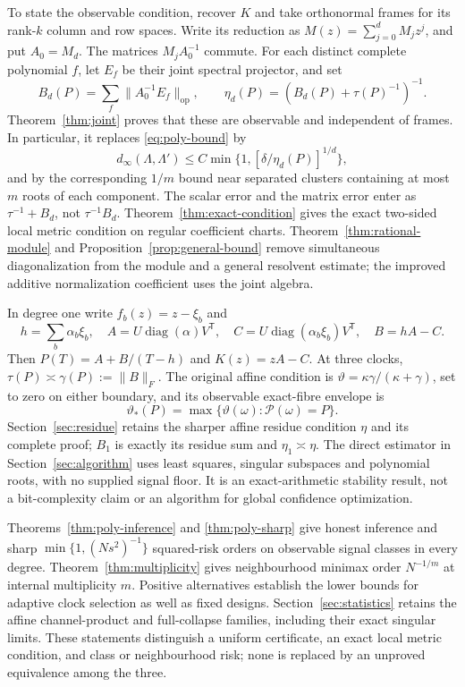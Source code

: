 \documentclass[11pt,reqno]{amsart}
\numberwithin{equation}{section}
\theoremstyle{definition}\newtheorem{definition}[theorem]{Definition}
\theoremstyle{remark}\newtheorem{remark}[theorem]{Remark}
\newcommand{\diag}{\operatorname{diag}}
\newcommand{\op}{\mathrm{op}}
\newcommand{\sig}{\vartheta}
\begin{document}
To state the observable condition, recover $K$ and take orthonormal
frames for its rank-$k$ column and row spaces. Write its reduction as
$M(z)=\sum_{j=0}^dM_jz^j$, and put $A_0=M_d$.
The matrices $M_jA_0^{-1}$ commute. For each distinct complete
polynomial $f$, let $E_f$ be their joint spectral projector, and set
\[
 B_d(P)=\sum_f\|A_0^{-1}E_f\|_\op,
 \qquad \eta_d(P)=(B_d(P)+\tau(P)^{-1})^{-1}.
\]
Theorem~\ref{thm:joint} proves that these are observable and independent
of frames. In particular, it replaces \eqref{eq:poly-bound} by
\[
 d_\infty(\Lambda,\Lambda')
       \le C\min\{1,[\delta/\eta_d(P)]^{1/d}\},
\]
and by the corresponding $1/m$ bound near separated clusters containing
at most $m$ roots of each component. The scalar error and the matrix
error enter as $\tau^{-1}+B_d$, not $\tau^{-1}B_d$.
Theorem~\ref{thm:exact-condition} gives the exact two-sided local metric
condition on regular coefficient charts. Theorem~\ref{thm:rational-module}
and Proposition~\ref{prop:general-bound} remove simultaneous
diagonalization from the module and a general resolvent estimate;
the improved additive normalization coefficient uses the joint algebra.

In degree one write $f_b(z)=z-\xi_b$ and
\begin{equation}\label{eq:affine}
 h=\sum_b\alpha_b\xi_b,\quad
 A=U\diag(\alpha)V^{\mathsf T},\quad
 C=U\diag(\alpha_b\xi_b)V^{\mathsf T},\quad B=hA-C.
\end{equation}
Then $P(T)=A+B/(T-h)$ and $K(z)=zA-C$. At three clocks,
$\tau(P)\asymp\gamma(P):=\|B\|_F$. The original affine condition is
$\sig=\kappa\gamma/(\kappa+\gamma)$, set to zero on either boundary,
and its observable exact-fibre envelope is
\begin{equation}\label{eq:envelope}
 \sig_*(P)=\max\{\sig(\omega):\mathcal P(\omega)=P\}.
\end{equation}
Section~\ref{sec:residue} retains the sharper affine residue condition
$\eta$ and its complete proof; $B_1$ is exactly its residue sum and
$\eta_1\asymp\eta$. The direct estimator in Section~\ref{sec:algorithm}
uses least squares, singular subspaces and polynomial roots, with no
supplied signal floor. It is an exact-arithmetic stability result, not
a bit-complexity claim or an algorithm for global confidence optimization.

Theorems~\ref{thm:poly-inference} and \ref{thm:poly-sharp} give honest
inference and sharp $\min\{1,(Ns^2)^{-1}\}$ squared-risk orders on
observable signal classes in every degree. Theorem~\ref{thm:multiplicity}
gives neighbourhood minimax order $N^{-1/m}$ at internal multiplicity
$m$. Positive alternatives establish the lower bounds for adaptive
clock selection as well as fixed designs. Section~\ref{sec:statistics}
retains the affine channel-product and full-collapse families, including
their exact singular limits. These statements distinguish a uniform
certificate, an exact local metric condition, and class or neighbourhood
risk; none is replaced by an unproved equivalence among the three.
\end{document}
